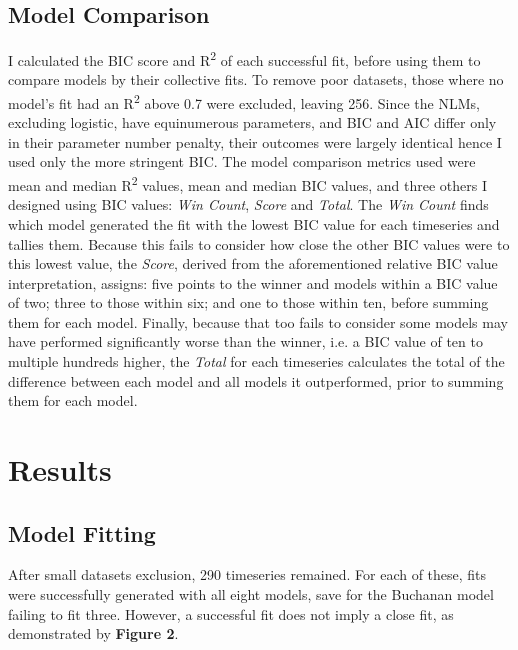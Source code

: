 \documentclass[11pt]{article}
\begin{document}
\subsection{Model Comparison}
I calculated the BIC score and R\textsuperscript{2} of each successful fit, before using them to compare models by their collective fits. To remove poor datasets, those where no model's fit had an R\textsuperscript{2} above 0.7 were excluded, leaving 256. Since the NLMs, excluding logistic, have equinumerous parameters, and BIC and AIC differ only in their parameter number penalty, their outcomes were largely identical hence I used only the more stringent BIC.
The model comparison metrics used were mean and median R\textsuperscript{2} values, mean and median BIC values, and three others I designed using BIC values: \textit{Win Count}, \textit{Score} and \textit{Total}. The \textit{Win Count} finds which model generated the fit with the lowest BIC value for each timeseries and tallies them. Because this fails to consider how close the other BIC values were to this lowest value, the \textit{Score}, derived from the aforementioned relative BIC value interpretation, assigns: five points to the winner and models within a BIC value of two; three to those within six; and one to those within ten, before summing them for each model. Finally, because that too fails to consider some models may have performed significantly worse than the winner, i.e. a BIC value of ten to multiple hundreds higher, the \textit{Total} for each timeseries calculates the total of the difference between each model and all models it outperformed, prior to summing them for each model.



\section{Results}%


\subsection{Model Fitting}

After small datasets exclusion, 290 timeseries remained. For each of these, fits were successfully generated with all eight models, save for the Buchanan model failing to fit three. However, a successful fit does not imply a close fit, as demonstrated by \textbf{Figure 2}. 
\end{document}
